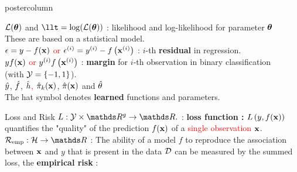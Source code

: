 \documentclass{beamer}
\begin{document}
\begin{frame}[fragile]{}
\begin{columns}
\begin{column}{.31\textwidth}
\begin{beamercolorbox}[center]{postercolumn}
\begin{minipage}{.98\textwidth}
{\begin{myblock}{}
              $\mathcal{L}(\bm{\theta})$ and $\llt = \log(\LLt)$ : likelihood and log-likelihood for parameter $\bm{\theta}$ \\
                \hspace*{1ex}These are based on a statistical model.\\
               
              \textcolor{red}{$\epsilon = y - f(\mathbf{x})$ or} $\epsilon^{(i)} = y^{(i)} - f\left(\mathbf{x}^{(i)}\right)$ : $i$-th \textbf{residual} in regression.\\

              \textcolor{red}{$y f(\mathbf{x})$ or} $y^{(i)} f\left(\mathbf{x}^{(i)}\right)$ : \textbf{margin} for $i$-th observation in binary classification \\
                \hspace*{1ex} (with $\mathcal{Y} = \{-1, 1\}$). \\
              
              $\hat{y}$, $\hat{f}$, \textcolor{red}{$\hat{h}$,} $\hat \pi_{k}(\mathbf{x})$, $\hat \pi(\mathbf{x})$ and $\hat{\theta}$ \\
                \hspace*{1ex}The hat symbol denotes \textbf{learned} functions and parameters.
					\end{myblock}
          \begin{myblock}{Loss and Risk}
				    $L: \Yspace \times \R^g \to \R.$ : \textbf{loss function : } $L\left(y, f(\mathbf{x})\right)$ quantifies the "quality" of the prediction $f(\mathbf{x})$ of a \textcolor{red}{single observation} $\mathbf{x}$.  \\
            
            $\riske:  \Hspace \to \R $ :  The ability of a model $f$ to reproduce the association between $\mathbf{x}$ and $y$ that is present in the data $\mathcal{D}$ can be measured by the summed loss, the \textbf{empirical risk }:
            

\end{myblock}}
\end{minipage}
\end{beamercolorbox}
\end{column}
\end{columns}
\end{frame}
\end{document}
